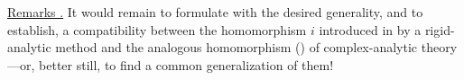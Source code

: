 \medskip
\noindent
\underline{Remarks .}  It would remain to formulate with the desired
generality, and to establish, a compatibility between the homomorphism
$i$ introduced in  by a rigid-analytic method and the analogous
homomorphism () of complex-analytic theory---or, better still, to
find a common generalization of them!

